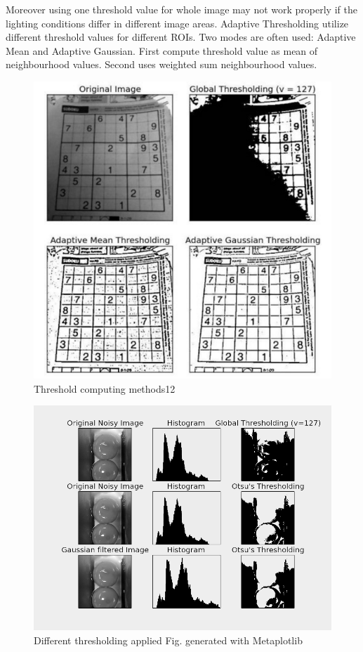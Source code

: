 \documentclass[12pt,twoside,a4paper]{article}
\begin{document}
Moreover using one threshold value for whole image may not work properly if the lighting conditions differ in different image areas.\cite{thre}
Adaptive Thresholding utilize different threshold values for different ROIs.
Two modes are often used: Adaptive Mean and Adaptive Gaussian.
First compute threshold value as mean of neighbourhood values.
Second uses weighted sum neighbourhood values.
 
\begin{figure}[H]
\centering
\includegraphics[width=0.4\paperwidth]{thremeth}
\caption{Threshold computing methods12\cite{thre}}
\end{figure}
 
\begin{figure}[H]
\centering
\includegraphics[width=0.4\paperwidth]{diffthr}
\caption{Different thresholding applied
Fig. generated with Metaplotlib}
\end{figure}
\end{document}
